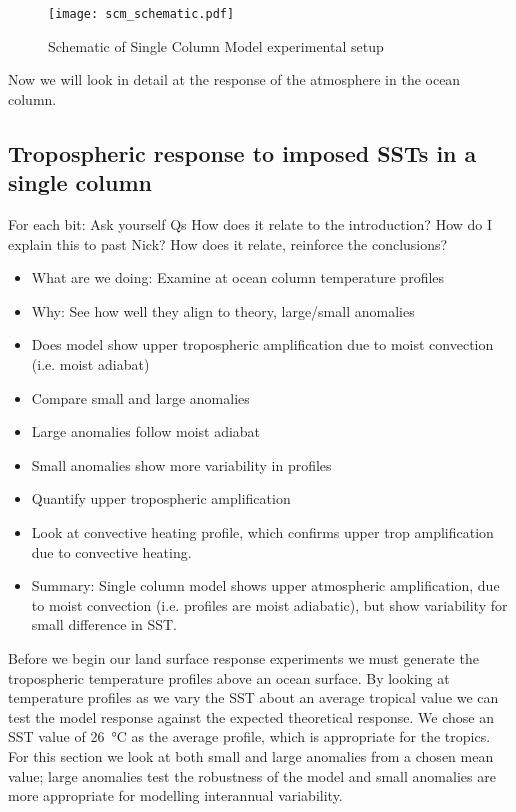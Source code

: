\begin{figure}[ht]
\texttt{[image: scm\_schematic.pdf]}
\caption{Schematic of Single Column Model experimental setup}
\label{fig:scmschem}
\end{figure}

Now we will look in detail at the response of the atmosphere in the ocean 
column.

\subsection{Tropospheric response to imposed SSTs in a single column}
\label{trop_response_ocean}

For each bit:
Ask yourself Qs
How does it relate to the introduction?
How do I explain this to past Nick?
How does it relate, reinforce the conclusions?

\begin{itemize}
	\item What are we doing: Examine at ocean column temperature profiles
	\item Why: See how well they align to theory, large/small anomalies
	\item Does model show upper tropospheric amplification due to moist 
		convection (i.e. moist adiabat)
	\item Compare small and large anomalies
	\item Large anomalies follow moist adiabat
	\item Small anomalies show more variability in profiles
	\item Quantify upper tropospheric amplification
	\item Look at convective heating profile, which confirms upper trop 
		amplification due to convective heating.
	\item Summary: Single column model shows upper atmospheric amplification, 
		due to moist convection (i.e. profiles are moist adiabatic), but show 
		variability for small difference in SST.
\end{itemize}

Before we begin our land surface response experiments we must generate the 
tropospheric temperature profiles above an ocean surface. By looking at 
temperature profiles as we vary the SST about an average tropical value we can 
test the model response against the expected theoretical response. We chose an 
SST value of \SI{26}{\degreeCelsius} as the average profile, which is 
appropriate for the tropics. For this section we look at both small and large 
anomalies from a chosen mean value; large anomalies test the robustness of the 
model and small anomalies are more appropriate for modelling interannual 
variability.

